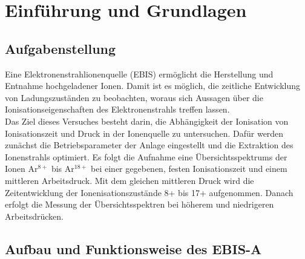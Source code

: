 \section{Einführung und Grundlagen}
    
    \subsection{Aufgabenstellung}
    Eine Elektronenstrahlionenquelle (EBIS) ermöglicht die Herstellung und Entnahme hochgeladener Ionen. Damit ist es möglich, die zeitliche Entwicklung von Ladungszuständen zu beobachten, woraus sich Aussagen über die Ionisationseigenschaften des Elektronenstrahls treffen lassen. \\
    Das Ziel dieses Versuches besteht darin, die Abhängigkeit der Ionisation von Ionisationszeit und Druck in der Ionenquelle zu untersuchen. Dafür werden zunächst die Betriebsparameter der Anlage eingestellt und die Extraktion des Ionenstrahls optimiert.
    Es folgt die Aufnahme eine Übersichtsspektrums der Ionen Ar$^{8+}$ bis Ar$^{18+}$ bei einer gegebenen, festen Ionisationszeit und einem mittleren Arbeitsdruck.
    Mit dem gleichen mittleren Druck wird die Zeitentwicklung der Ionenisationszustände 8+ bis 17+ aufgenommen.
    Danach erfolgt die Messung der Übersichtsspektren bei höherem und niedrigeren Arbeitsdrücken.
    \subsection{Aufbau und Funktionsweise des EBIS-A}
    

